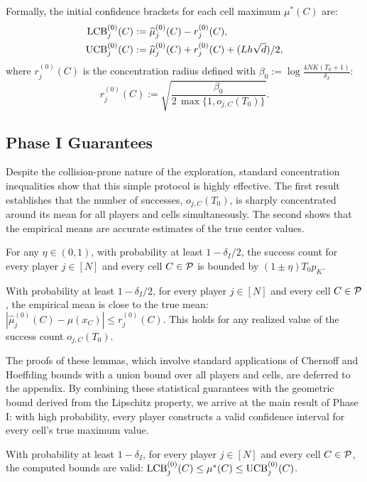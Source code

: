 Formally, the initial confidence brackets for each cell maximum $\mu^*(C)$ are:
\begin{equation}
\label{eq:phase1-brackets}
\begin{aligned}
\operatorname{LCB}^{(0)}_j(C) &:= \widehat{\mu}_{j}^{(0)}(C) - r^{(0)}_{j}(C), \\
\operatorname{UCB}^{(0)}_j(C) &:= \widehat{\mu}_{j}^{(0)}(C) + r^{(0)}_{j}(C) + (Lh\sqrt{d})/2,
\end{aligned}
\end{equation}
where $r^{(0)}_{j}(C)$ is the concentration radius defined with $\beta_0 := \log \frac{4NK(T_0+1)}{\delta_I}$:
\begin{equation}
\label{eq:r0}
r^{(0)}_{j}(C) := \sqrt{\frac{\beta_0}{2\,\max\{1, o_{j,C}(T_0)\}}}.
\end{equation}


\subsection{Phase I Guarantees}
Despite the collision-prone nature of the exploration, standard concentration inequalities show that this simple protocol is highly effective. The first result establishes that the number of successes, $o_{j,C}(T_0)$, is sharply concentrated around its mean for all players and cells simultaneously. The second shows that the empirical means are accurate estimates of the true center values.

\begin{lemma}
\label{lem:counts}
For any $\eta\in(0,1)$, with probability at least $1-\delta_{I}/2$, the success count for every player $j\in[N]$ and every cell $C\in \mathcal{P}$ is bounded by $(1\pm\eta) T_0 p_K$.
\end{lemma}

\begin{lemma}
\label{lem:means}
With probability at least $1-\delta_{I}/2$, for every player $j\in[N]$ and every cell $C\in \mathcal{P}$, the empirical mean is close to the true mean: $|\widehat{\mu}_j^{(0)}(C) - \mu(x_C)| \le r^{(0)}_{j}(C)$. This holds for any realized value of the success count $o_{j,C}(T_0)$.
\end{lemma}

The proofs of these lemmas, which involve standard applications of Chernoff and Hoeffding bounds with a union bound over all players and cells, are deferred to the appendix. By combining these statistical guarantees with the geometric bound derived from the Lipschitz property, we arrive at the main result of Phase I: with high probability, every player constructs a valid confidence interval for every cell's true maximum value.

\begin{proposition}
\label{prop:phase1-brackets}
With probability at least $1-\delta_{I}$, for every player $j\in[N]$ and every cell $C\in \mathcal{P}$, the computed bounds are valid: $\operatorname{LCB}^{(0)}_j(C) \le \mu^\ast(C) \le \operatorname{UCB}^{(0)}_j(C)$.
\end{proposition}
